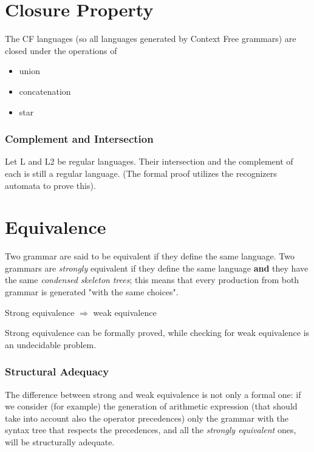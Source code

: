 	\section{Closure Property}
		The CF languages (so all languages generated by Context Free grammars) are closed under the operations of
		\begin{itemize}
			\item union
			\item concatenation
			\item star
		\end{itemize}
		
		\subsubsection{Complement and Intersection}
			Let L and L2 be regular languages. Their intersection and the complement of each is still a regular language. (The formal proof utilizes the 
			recognizers automata to prove this).
	
	\section{Equivalence}
		Two grammar are said to be equivalent if they define the same language. Two grammars are \emph{strongly} equivalent if they define the same language 
		\textbf{and} they have the same \emph{condensed} \emph{skeleton} \emph{trees}; this means that every production from both grammar is generated 
		"with the same choices".

		Strong equivalence $\Rightarrow$ weak equivalence

		Strong equivalence can be formally proved, while checking for weak equivalence is an undecidable problem.

		\subsubsection{Structural Adequacy}
			The difference between strong and weak equivalence is not only a formal one: if we consider (for example) the generation of arithmetic expression 
			(that should take into account also the operator precedences) only the grammar with the syntax tree that respects the precedences, and all the 
			\emph{strongly equivalent} ones, will be structurally adequate.

